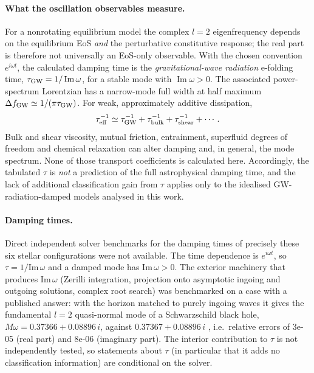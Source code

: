 \documentclass[11pt,a4paper]{article}
\begin{document}
\paragraph{What the oscillation observables measure.}
For a nonrotating equilibrium model the complex $l=2$ eigenfrequency depends on the equilibrium EoS \emph{and} the perturbative constitutive response; the real part is therefore not universally an EoS-only observable. With the chosen convention $e^{i\omega t}$, the calculated damping time is the \emph{gravitational-wave radiation} e-folding time, $\tau_{\rm GW}=1/\operatorname{Im}\omega$, for a stable mode with $\operatorname{Im}\omega>0$. The associated power-spectrum Lorentzian has a narrow-mode full width at half maximum $\Delta f_{\rm GW}\simeq 1/(\pi\tau_{\rm GW})$. For weak, approximately additive dissipation,
\begin{equation}
  \tau_{\rm eff}^{-1}\simeq \tau_{\rm GW}^{-1}+
  \tau_{\rm bulk}^{-1}+\tau_{\rm shear}^{-1}+\cdots .
\end{equation}
Bulk and shear viscosity, mutual friction, entrainment, superfluid degrees of freedom and chemical relaxation can alter damping and, in general, the mode spectrum. None of those transport coefficients is calculated here. Accordingly, the tabulated $\tau$ is \emph{not} a prediction of the full astrophysical damping time, and the lack of additional classification gain from $\tau$ applies only to the idealised GW-radiation-damped models analysed in this work.
\paragraph{Damping times.} Direct independent solver benchmarks for the damping times of precisely these six stellar configurations were not available. The time dependence is $e^{i\omega t}$, so $\tau=1/\mathrm{Im}\,\omega$ and a damped mode has $\mathrm{Im}\,\omega>0$. The exterior machinery that produces $\mathrm{Im}\,\omega$ (Zerilli integration, projection onto asymptotic ingoing and outgoing solutions, complex root search) was benchmarked on a case with a published answer: with the horizon matched to purely ingoing waves it gives the fundamental $l=2$ quasi-normal mode of a Schwarzschild black hole, $M\omega=0.37366+0.08896\,i$, against $0.37367+0.08896\,i$ \citep{Leaver85}, i.e.\ relative errors of 3e-05 (real part) and 8e-06 (imaginary part). The interior contribution to $\tau$ is not independently tested, so statements about $\tau$ (in particular that it adds no classification information) are conditional on the solver.
\end{document}
